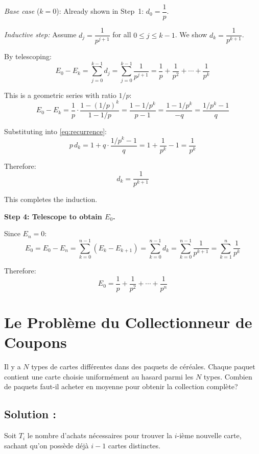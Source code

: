   

\textit{Base case} ($k = 0$): Already shown in Step~1: $d_0 = \dfrac{1}{p}$. \checkmark

\medskip
\textit{Inductive step:} Assume $d_j = \dfrac{1}{p^{j+1}}$ for all $0 \leq j \leq k-1$. We show $d_k = \dfrac{1}{p^{k+1}}$.

By telescoping:
\[
    E_0 - E_k = \sum_{j=0}^{k-1} d_j = \sum_{j=0}^{k-1} \frac{1}{p^{j+1}} = \frac{1}{p} + \frac{1}{p^2} + \cdots + \frac{1}{p^k}
\]

This is a geometric series with ratio $1/p$:
\[
    E_0 - E_k = \frac{1}{p} \cdot \frac{1 - (1/p)^k}{1 - 1/p} = \frac{1 - 1/p^k}{\displaystyle p - 1} = \frac{1 - 1/p^k}{-q} = \frac{1/p^k - 1}{q}
\]

Substituting into \eqref{eq:recurrence}:
\[
    p\,d_k = 1 + q \cdot \frac{1/p^k - 1}{q} = 1 + \frac{1}{p^k} - 1 = \frac{1}{p^k}
\]

Therefore:
\[
    d_k = \frac{1}{p^{k+1}}
\]

This completes the induction.

\medskip
\textbf{Step 4: Telescope to obtain $E_0$.}

Since $E_n = 0$:
\[
    E_0 = E_0 - E_n = \sum_{k=0}^{n-1} (E_k - E_{k+1}) = \sum_{k=0}^{n-1} d_k = \sum_{k=0}^{n-1} \frac{1}{p^{k+1}} = \sum_{k=1}^{n} \frac{1}{p^k}
\]

Therefore:
\[
    \boxed{\displaystyle E_0 = \frac{1}{p} + \frac{1}{p^2} + \cdots + \frac{1}{p^n}}
\]


\section{Le Problème du Collectionneur de Coupons}

\begin{exerciseBox}
Il y a $N$ types de cartes différentes dans des paquets de céréales. Chaque paquet contient une carte choisie uniformément au hasard parmi les $N$ types. Combien de paquets faut-il acheter en moyenne pour obtenir la collection complète?
\end{exerciseBox}



\subsection*{Solution :}

Soit $T_i$ le nombre d'achats nécessaires pour trouver la $i$-ième nouvelle carte, sachant qu'on possède déjà $i-1$ cartes distinctes.


